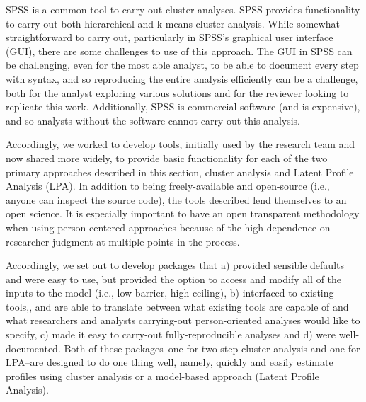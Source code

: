 \documentclass[man]{apa6}
\begin{document}
SPSS is a common tool to carry out cluster analyses. SPSS provides
functionality to carry out both hierarchical and k-means cluster
analysis. While somewhat straightforward to carry out, particularly in
SPSS's graphical user interface (GUI), there are some challenges to use
of this approach. The GUI in SPSS can be challenging, even for the most
able analyst, to be able to document every step with syntax, and so
reproducing the entire analysis efficiently can be a challenge, both for
the analyst exploring various solutions and for the reviewer looking to
replicate this work. Additionally, SPSS is commercial software (and is
expensive), and so analysts without the software cannot carry out this
analysis.

Accordingly, we worked to develop tools, initially used by the research
team and now shared more widely, to provide basic functionality for each
of the two primary approaches described in this section, cluster
analysis and Latent Profile Analysis (LPA). In addition to being
freely-available and open-source (i.e., anyone can inspect the source
code), the tools described lend themselves to an open science. It is
especially important to have an open transparent methodology when using
person-centered approaches because of the high dependence on researcher
judgment at multiple points in the process.

Accordingly, we set out to develop packages that a) provided sensible
defaults and were easy to use, but provided the option to access and
modify all of the inputs to the model (i.e., low barrier, high ceiling),
b) interfaced to existing tools,, and are able to translate between what
existing tools are capable of and what researchers and analysts
carrying-out person-oriented analyses would like to specify, c) made it
easy to carry-out fully-reproducible analyses and d) were
well-documented. Both of these packages--one for two-step cluster
analysis and one for LPA--are designed to do one thing well, namely,
quickly and easily estimate profiles using cluster analysis or a
model-based approach (Latent Profile Analysis).
\end{document}
